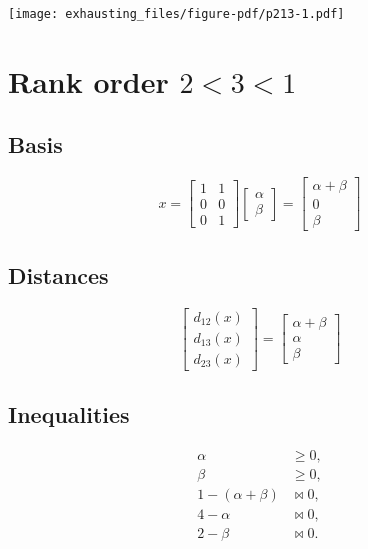 \documentclass[
  12pt,
  letterpaper,
  DIV=11,
  numbers=noendperiod]{scrartcl}
\begin{document}
\begin{center}
\texttt{[image: exhausting\_files/figure-pdf/p213-1.pdf]}
\end{center}

\pagebreak

\section{\texorpdfstring{Rank order
\(2<3<1\)}{Rank order 2\textless3\textless1}}\label{rank-order-231}

\subsection{Basis}\label{basis-3}

\[
x=\begin{bmatrix}
1&1\\
0&0\\
0&1
\end{bmatrix}
\begin{bmatrix}
\alpha\\
\beta
\end{bmatrix}=
\begin{bmatrix}
\alpha+\beta\\
0\\
\beta
\end{bmatrix}
\]

\subsection{Distances}\label{distances-3}

\[
\begin{bmatrix}
d_{12}(x)\\
d_{13}(x)\\
d_{23}(x)
\end{bmatrix}
=\begin{bmatrix}
\alpha+\beta\\
\alpha\\
\beta
\end{bmatrix}
\]

\subsection{Inequalities}\label{inequalities-3}

\begin{align}
\alpha&\geq 0,\\
\beta&\geq 0,\\
1-(\alpha+\beta)&\bowtie 0,\\
4-\alpha&\bowtie 0,\\
2-\beta&\bowtie 0.
\end{align}
\end{document}

